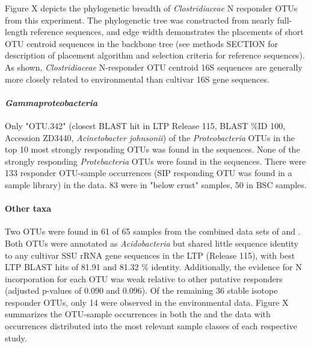 Figure X depicts the phylogenetic breadth of \textit{Clostridiaceae} N responder OTUs from this experiment. The phylogenetic tree was constructed from nearly full-length reference sequences, and edge width demonstrates the placements of short OTU centroid sequences in the backbone tree (see methods SECTION for description of placement algorithm and selection criteria for reference sequences). As shown, \textit{Clostridiaceae} N-responder OTU centroid 16S sequences are generally more closely related to environmental than cultivar 16S gene sequences.   

\paragraph{\textit{Gammaproteobacteria}}
Only "OTU.342" (closest BLAST hit in LTP Release 115, BLAST \%ID 100, Accession ZD3440, \textit{Acinetobacter johnsonii}) of the \textit{Proteobacteria} OTUs in the top 10 most strongly responding OTUs was found in the \citet{Garcia_Pichel_2013} sequences. None of the strongly responding \textit{Protebacteria} OTUs were found in the \citet{Steven_2013} sequences. There were 133 responder OTU-sample occurrences (SIP responding OTU was found in a sample library) in the \citet{Steven_2013} data. 83 were in "below crust" samples, 50 in BSC samples.
\paragraph{Other taxa} 
Two OTUs were found in 61 of 65 samples from the combined data sets of \citet{Garcia_Pichel_2013} and \citet{Steven_2013}. Both OTUs were annotated as \textit{Acidobacteria} but shared little sequence identity to any cultivar SSU rRNA gene sequences in the LTP (Release 115), with best LTP BLAST hits of 81.91 and 81.32 \% identity. Additionally, the evidence for N incorporation for each OTU was weak relative to other putative responders (adjusted p-values of 0.090 and 0.096). Of the remaining 36 stable isotope responder OTUs, only 14 were observed in the environmental data. Figure X summarizes the OTU-sample occurrences in both the \citet{Steven_2013} and the \citet{Garcia_Pichel_2013} data with occurrences distributed into the most relevant sample classes of each respective study.

